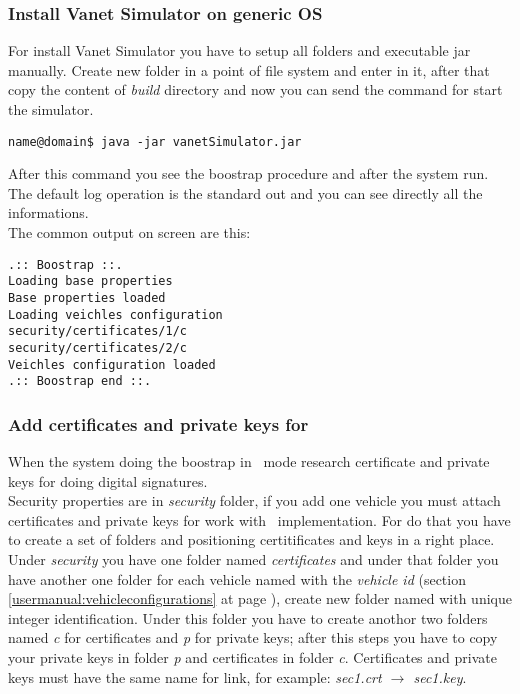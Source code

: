 \subsubsection{Install Vanet Simulator on generic OS}
For install Vanet Simulator you have to setup all folders and executable jar manually. Create new folder in a point of file system and enter in it, after that copy the content of \textit{build} directory and now you can send the command for start the simulator.
\begin{verbatim}
name@domain$ java -jar vanetSimulator.jar
\end{verbatim}
After this command you see the boostrap procedure and after the system run. The default log operation is the standard out and you can see directly all the informations.\\
The common output on screen are this:
\begin{verbatim}
.:: Boostrap ::.
Loading base properties
Base properties loaded
Loading veichles configuration
security/certificates/1/c
security/certificates/2/c
Veichles configuration loaded
.:: Boostrap end ::.
\end{verbatim}
\subsubsection{Add certificates and private keys for \baseline}\label{usermanual:preloadkey}
When the system doing the boostrap in \baseline~mode research certificate and private keys for doing digital signatures.\\
Security properties are in \textit{security} folder, if you add one vehicle you must attach certificates and private keys for work with \baseline~implementation. For do that you have to create a set of folders and positioning certitificates and keys in a right place. Under \textit{security} you have one folder named \textit{certificates} and under that folder you have another one folder for each vehicle named with the \textit{vehicle id} (section \ref{usermanual:vehicleconfigurations} at page \pageref{usermanual:vehicleconfigurations}), create new folder named with unique integer identification. Under this folder you have to create anothor two folders named \textit{c} for certificates and \textit{p} for private keys; after this steps you have to copy your private keys in folder \textit{p} and certificates in folder \textit{c}. Certificates and private keys must have the same name for link, for example: \textit{sec1.crt $\rightarrow$ sec1.key}.

